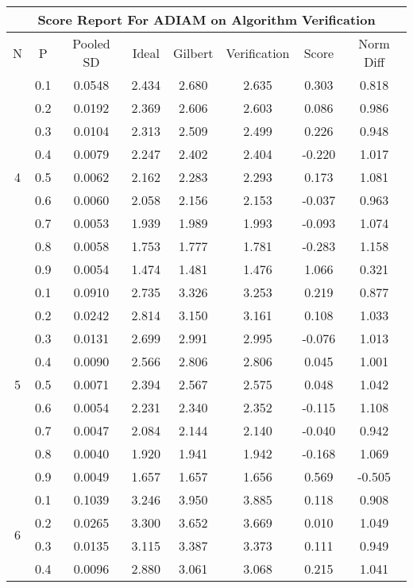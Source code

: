 \documentclass[11pt,a4paper]{report}
\begin{document}
\begin{longtable}{ | c | c || c | c | c | c | c | c | }
\hline
\multicolumn{8}{|c|}{ Score Report For ADIAM on Algorithm Verification} \\
\hline
N & P & Pooled SD &  Ideal &  Gilbert & Verification  & Score & Norm Diff \\
 \hline
 \hline
 \endhead
\multirow{9}{*}{4} & 0.1 & 0.0548 & 2.434 & 2.680 & 2.635 & 0.303 & 0.818 \\
 & 0.2 & 0.0192 & 2.369 & 2.606 & 2.603 & 0.086 & 0.986 \\
 & 0.3 & 0.0104 & 2.313 & 2.509 & 2.499 & 0.226 & 0.948 \\
 & 0.4 & 0.0079 & 2.247 & 2.402 & 2.404 & -0.220 & 1.017 \\
 & 0.5 & 0.0062 & 2.162 & 2.283 & 2.293 & 0.173 & 1.081 \\
 & 0.6 & 0.0060 & 2.058 & 2.156 & 2.153 & -0.037 & 0.963 \\
 & 0.7 & 0.0053 & 1.939 & 1.989 & 1.993 & -0.093 & 1.074 \\
 & 0.8 & 0.0058 & 1.753 & 1.777 & 1.781 & -0.283 & 1.158 \\
 & 0.9 & 0.0054 & 1.474 & 1.481 & 1.476 & 1.066 & 0.321 \\
 \hline
\multirow{9}{*}{5} & 0.1 & 0.0910 & 2.735 & 3.326 & 3.253 & 0.219 & 0.877 \\
 & 0.2 & 0.0242 & 2.814 & 3.150 & 3.161 & 0.108 & 1.033 \\
 & 0.3 & 0.0131 & 2.699 & 2.991 & 2.995 & -0.076 & 1.013 \\
 & 0.4 & 0.0090 & 2.566 & 2.806 & 2.806 & 0.045 & 1.001 \\
 & 0.5 & 0.0071 & 2.394 & 2.567 & 2.575 & 0.048 & 1.042 \\
 & 0.6 & 0.0054 & 2.231 & 2.340 & 2.352 & -0.115 & 1.108 \\
 & 0.7 & 0.0047 & 2.084 & 2.144 & 2.140 & -0.040 & 0.942 \\
 & 0.8 & 0.0040 & 1.920 & 1.941 & 1.942 & -0.168 & 1.069 \\
 & 0.9 & 0.0049 & 1.657 & 1.657 & 1.656 & 0.569 & -0.505 \\
 \hline
\multirow{9}{*}{6} & 0.1 & 0.1039 & 3.246 & 3.950 & 3.885 & 0.118 & 0.908 \\
 & 0.2 & 0.0265 & 3.300 & 3.652 & 3.669 & 0.010 & 1.049 \\
 & 0.3 & 0.0135 & 3.115 & 3.387 & 3.373 & 0.111 & 0.949 \\
 & 0.4 & 0.0096 & 2.880 & 3.061 & 3.068 & 0.215 & 1.041 \\

\end{longtable}
\end{document}
